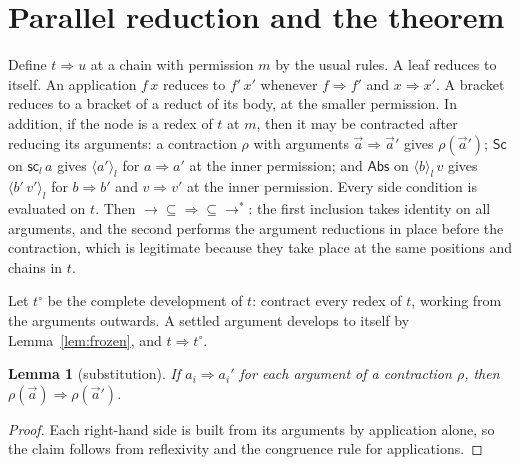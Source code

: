 \documentclass[11pt]{article}
\newtheorem{lemma}[theorem]{Lemma}
\theoremstyle{definition}
\newcommand{\red}{\rightarrow}
\newcommand{\pa}{\Rightarrow}
\newcommand{\Sc}{\mathsf{Sc}}
\newcommand{\Abs}{\mathsf{Abs}}
\newcommand{\scn}[1]{\mathsf{sc}_{#1}}
\newcommand{\br}[2]{\langle #1\rangle_{#2}}
\begin{document}
\section{Parallel reduction and the theorem}

Define $t\pa u$ at a chain with permission $m$ by the usual rules. A leaf reduces to itself. An application $f\,x$ reduces to $f'\,x'$ whenever $f\pa f'$ and $x\pa x'$. A bracket reduces to a bracket of a reduct of its body, at the smaller permission. In addition, if the node is a redex of $t$ at $m$, then it may be contracted after reducing its arguments: a contraction $\rho$ with arguments $\vec a\pa\vec a'$ gives $\rho(\vec a')$; $\Sc$ on $\scn{l}\,a$ gives $\br{a'}{l}$ for $a\pa a'$ at the inner permission; and $\Abs$ on $\br{b}{l}\,v$ gives $\br{b'\,v'}{l}$ for $b\pa b'$ and $v\pa v'$ at the inner permission. Every side condition is evaluated on $t$. Then $\red\subseteq\pa\subseteq\red^{*}$: the first inclusion takes identity on all arguments, and the second performs the argument reductions in place before the contraction, which is legitimate because they take place at the same positions and chains in $t$.

Let $t^\circ$ be the complete development of $t$: contract every redex of $t$, working from the arguments outwards. A settled argument develops to itself by Lemma~\ref{lem:frozen}, and $t\pa t^\circ$.

\begin{lemma}[substitution]\label{lem:subst}
If $a_i\pa a_i'$ for each argument of a contraction $\rho$, then $\rho(\vec a)\pa\rho(\vec a')$.
\end{lemma}
\begin{proof}
Each right-hand side is built from its arguments by application alone, so the claim follows from reflexivity and the congruence rule for applications.
\end{proof}
\end{document}
